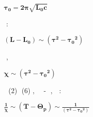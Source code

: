 \documentclass{article}
\newcommand{\unicode}[1]{{}}
\begin{document}
\begin{doublespace}
\noindent\(\pmb{\tau _0=2\pi \sqrt{L_0c}}\)
\end{doublespace}

$\unicode{041e}\unicode{0442}\unicode{0441}\unicode{044e}\unicode{0434}\unicode{0430}$ $\unicode{0438}\unicode{043c}\unicode{0435}\unicode{0435}\unicode{043c}$:

\begin{doublespace}
\noindent\(\pmb{\left(L-L_0\right)\sim \left(\tau ^2-\tau _0{}^2\right)}\)
\end{doublespace}

$\unicode{0422}\unicode{0430}\unicode{043a}\unicode{0438}\unicode{043c}$ $\unicode{043e}\unicode{0431}\unicode{0440}\unicode{0430}\unicode{0437}\unicode{043e}\unicode{043c}$,

\begin{doublespace}
\noindent\(\pmb{\chi \sim \left(\tau ^2-\tau _0{}^2\right)}\)
\end{doublespace}

$\unicode{0418}\unicode{0437}$ $\unicode{0444}\unicode{043e}\unicode{0440}\unicode{043c}\unicode{0443}\unicode{043b}$ (2) $\unicode{0438}$ (6) $\unicode{0441}\unicode{043b}\unicode{0435}\unicode{0434}\unicode{0443}\unicode{0435}\unicode{0442}$,
$\unicode{0447}\unicode{0442}\unicode{043e}$ $\unicode{0437}\unicode{0430}\unicode{043a}\unicode{043e}\unicode{043d}$ $\unicode{041a}\unicode{044e}\unicode{0440}\unicode{0438}$
- $\unicode{0412}\unicode{0435}\unicode{0439}\unicode{0441}\unicode{0441}\unicode{0430}$ $\unicode{0441}\unicode{043f}\unicode{0440}\unicode{0430}\unicode{0432}\unicode{0435}\unicode{0434}\unicode{043b}\unicode{0438}\unicode{0432}$,
$\unicode{0435}\unicode{0441}\unicode{043b}\unicode{0438}$ $\unicode{0432}\unicode{044b}\unicode{043f}\unicode{043e}\unicode{043b}\unicode{043d}\unicode{0435}\unicode{043d}\unicode{043e}$
$\unicode{0441}\unicode{043e}\unicode{043e}\unicode{0442}\unicode{043d}\unicode{043e}\unicode{0448}\unicode{0435}\unicode{043d}\unicode{0438}\unicode{0435}$:

\begin{doublespace}
\noindent\(\pmb{\frac{1}{\chi }\sim \left(T-\Theta _p\right)\sim \frac{1}{\left(\tau ^2-\tau _0{}^2\right)}}\)
\end{doublespace}
\end{document}

